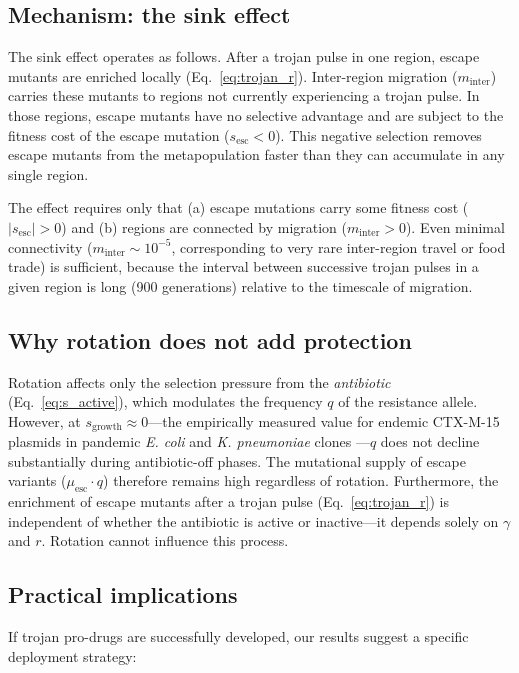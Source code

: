\documentclass[12pt,a4paper]{article}
\begin{document}
\subsection{Mechanism: the sink effect}

The sink effect operates as follows. After a trojan pulse in one region, escape mutants are enriched locally (Eq.\ \ref{eq:trojan_r}). Inter-region migration ($m_{\text{inter}}$) carries these mutants to regions not currently experiencing a trojan pulse. In those regions, escape mutants have no selective advantage and are subject to the fitness cost of the escape mutation ($s_{\text{esc}} < 0$). This negative selection removes escape mutants from the metapopulation faster than they can accumulate in any single region.

The effect requires only that (a) escape mutations carry some fitness cost ($|s_{\text{esc}}| > 0$) and (b) regions are connected by migration ($m_{\text{inter}} > 0$). Even minimal connectivity ($m_{\text{inter}} \sim 10^{-5}$, corresponding to very rare inter-region travel or food trade) is sufficient, because the interval between successive trojan pulses in a given region is long (900 generations) relative to the timescale of migration.

\subsection{Why rotation does not add protection}

Rotation affects only the selection pressure from the \textit{antibiotic} (Eq.\ \ref{eq:s_active}), which modulates the frequency $q$ of the resistance allele. However, at $s_{\text{growth}} \approx 0$---the empirically measured value for endemic CTX-M-15 plasmids in pandemic \textit{E. coli} and \textit{K. pneumoniae} clones \cite{dunn2019, maharjan2020}---$q$ does not decline substantially during antibiotic-off phases. The mutational supply of escape variants ($\mu_{\text{esc}} \cdot q$) therefore remains high regardless of rotation. Furthermore, the enrichment of escape mutants after a trojan pulse (Eq.\ \ref{eq:trojan_r}) is independent of whether the antibiotic is active or inactive---it depends solely on $\gamma$ and $r$. Rotation cannot influence this process.

\subsection{Practical implications}

If trojan pro-drugs are successfully developed, our results suggest a specific deployment strategy:
\end{document}

